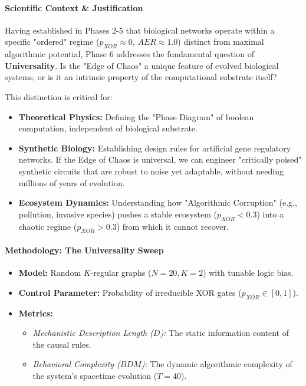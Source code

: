 \paragraph{Scientific Context \& Justification}
Having established in Phases 2-5 that biological networks operate within a specific "ordered" regime ($p_{XOR} \approx 0$, $AER \approx 1.0$) distinct from maximal algorithmic potential, Phase 6 addresses the fundamental question of \textbf{Universality}. Is the "Edge of Chaos" a unique feature of evolved biological systems, or is it an intrinsic property of the computational substrate itself?

This distinction is critical for:
\begin{itemize}
    \item \textbf{Theoretical Physics:} Defining the "Phase Diagram" of boolean computation, independent of biological substrate.
    \item \textbf{Synthetic Biology:} Establishing design rules for artificial gene regulatory networks. If the Edge of Chaos is universal, we can engineer "critically poised" synthetic circuits that are robust to noise yet adaptable, without needing millions of years of evolution.
    \item \textbf{Ecosystem Dynamics:} Understanding how "Algorithmic Corruption" (e.g., pollution, invasive species) pushes a stable ecosystem ($p_{XOR} < 0.3$) into a chaotic regime ($p_{XOR} > 0.3$) from which it cannot recover.
\end{itemize}

\paragraph{Methodology: The Universality Sweep}
\begin{itemize}
    \item \textbf{Model:} Random $K$-regular graphs ($N=20, K=2$) with tunable logic bias.
    \item \textbf{Control Parameter:} Probability of irreducible XOR gates ($p_{XOR} \in [0, 1]$).
    \item \textbf{Metrics:}
    \begin{itemize}
        \item \textit{Mechanistic Description Length ($D$):} The static information content of the causal rules.
        \item \textit{Behavioral Complexity ($BDM$):} The dynamic algorithmic complexity of the system's spacetime evolution ($T=40$).
    \end{itemize}
\end{itemize}

